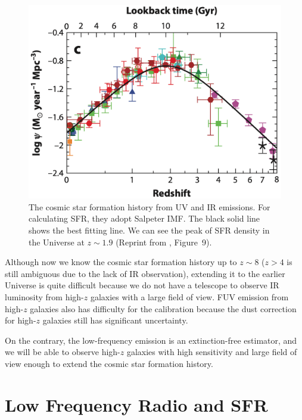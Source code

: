 \begin{figure}[htbp]
	\centering
	\includegraphics[width=.7\linewidth]{Chapter_1/Figures/Madau2014_Figure9.png}
    \caption[Cosmic star formation history]{\label{fig:Madau2014_figure9}
        The cosmic star formation history from UV and IR emissions.
        For calculating SFR, they adopt Salpeter IMF\@.
        The black solid line shows the best fitting line.
        We can see the peak of SFR density in the Universe at $z\sim1.9$
        (Reprint from \citealt{Madau2014}, Figure~9).
    }
\end{figure}

Although now we know the cosmic star formation history up to $z\sim8$ ($z > 4$ is still ambiguous due to the lack of IR observation), extending it to the earlier Universe is quite difficult because we do not have a telescope to observe IR luminosity from high-$z$ galaxies with a large field of view.
FUV emission from high-$z$ galaxies also has difficulty for the calibration because the dust correction for high-$z$ galaxies still has significant uncertainty.

On the contrary, the low-frequency emission is an extinction-free estimator, and we will be able to observe high-$z$ galaxies with high sensitivity and large field of view enough to extend the cosmic star formation history.





\section{Low Frequency Radio and SFR}\label{sec:lowradiofrequenciesandsfr}

